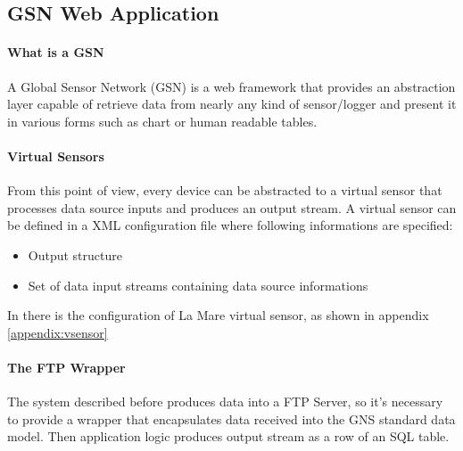 \subsection{GSN Web Application }
\paragraph{What is a GSN \cite{cll1}}
A Global Sensor Network (GSN) is a web framework that provides an abstraction layer capable of retrieve data from nearly any kind of sensor/logger and present it in various forms such as chart or human readable tables.
\paragraph{Virtual Sensors}
From this point of view, every device can be abstracted to a virtual sensor that processes data source inputs and produces an output stream. A virtual sensor can be defined in a XML configuration file where following informations are specified:
\begin{itemize}
	\item Output structure
	\item Set of data input streams containing data source informations
\end{itemize}
In \cite{cll1} there is the configuration of La Mare virtual sensor, as shown in appendix \ref{appendix:vsensor}
\paragraph{The FTP Wrapper}
The system described before produces data into a FTP Server, so it's necessary to provide a wrapper that encapsulates data received into the GNS standard data model. Then application logic produces output stream as a row of an SQL table.